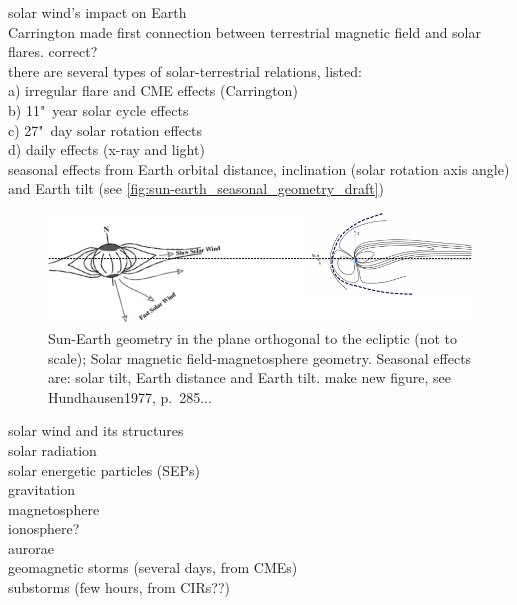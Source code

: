 solar wind's impact on Earth\\

Carrington made first connection between terrestrial magnetic field and solar flares. correct?\\

there are several types of solar-terrestrial relations, \citet{Bartels1962} listed:\\	%
a) irregular flare and CME effects (Carrington)\\
b) 11"~year solar cycle effects\\
c) 27"~day solar rotation effects\\
d) daily effects (x-ray and light)\\

seasonal effects from Earth orbital distance, inclination (solar rotation axis angle) and Earth tilt (see \autoref{fig:sun-earth_seasonal_geometry_draft})\\
\begin{figure}[htb]
	\centering
	\includegraphics[width=\textwidth]{images/own_figures/sun-earth_seasonal_geometry_draft.png}
	\caption{Sun-Earth geometry in the plane orthogonal to the ecliptic (not to scale); Solar magnetic field-magnetosphere geometry. Seasonal effects are: solar tilt, Earth distance and Earth tilt. make new figure, see Hundhausen1977, p.~285...}
	\label{fig:sun-earth_seasonal_geometry_draft}
\end{figure}

solar wind and its structures\\
solar radiation\\
solar energetic particles (SEPs)\\
gravitation\\

magnetosphere\\
ionosphere?\\
aurorae\\
geomagnetic storms (several days, from CMEs)\\
substorms (few hours, from CIRs??)\\

